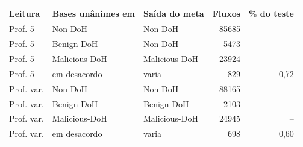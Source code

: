 \begin{tabular}{lllrr}
\hline
\textbf{Leitura} & \textbf{Bases unânimes em} & \textbf{Saída do meta} & \textbf{Fluxos} & \textbf{\% do teste} \\ \hline
Prof. 5 & Non-DoH & Non-DoH & 85685 & -- \\
Prof. 5 & Benign-DoH & Non-DoH & 5473 & -- \\
Prof. 5 & Malicious-DoH & Malicious-DoH & 23924 & -- \\
Prof. 5 & em desacordo & varia & 829 & 0,72 \\
\hline
Prof. var. & Non-DoH & Non-DoH & 88165 & -- \\
Prof. var. & Benign-DoH & Benign-DoH & 2103 & -- \\
Prof. var. & Malicious-DoH & Malicious-DoH & 24945 & -- \\
Prof. var. & em desacordo & varia & 698 & 0,60 \\
\hline
\end{tabular}
